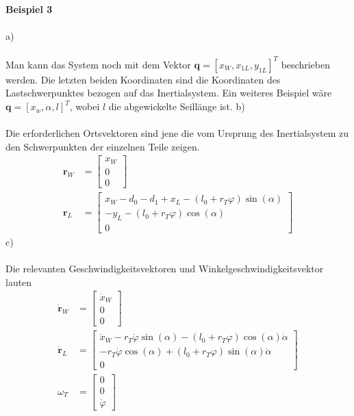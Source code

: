 \newpage
\noindent
\textbf{Beispiel 3}\\ \\
a)\\ \\
Man kann das System noch mit dem Vektor $\textbf{q} = [x_W , x_{1L} , y_{1L}]^T$ beschrieben werden. Die letzten beiden Koordinaten sind die Koordinaten des Lastschwerpunktes bezogen auf das Inertialsystem. Ein weiteres Beispiel wäre $\textbf{q} =[x_w , \alpha , l]^T$, wobei $l$ die abgewickelte Seillänge ist.
b)\\ \\
Die erforderlichen Ortsvektoren sind jene die vom Ursprung des Inertialsystem zu den Schwerpunkten der einzelnen Teile zeigen.
\begin{align*}
	\textbf{r}_W &= \begin{bmatrix}
		x_W \\
		0 \\
		0
	\end{bmatrix}
	\\
	\textbf{r}_L &= \begin{bmatrix}
		x_W - d_0 - d_1 + x_L - (l_0 + r_T\varphi)\sin(\alpha) \\
		-y_L - (l_0 + r_T\varphi)\cos(\alpha) \\
		0
	\end{bmatrix}
\end{align*}
c)\\ \\
Die relevanten Geschwindigkeitsvektoren und Winkelgeschwindigkeitsvektor lauten
\begin{align*}
	\dot{\textbf{r}}_W &= \begin{bmatrix}
		\dot{x}_W \\
		0 \\
		0
	\end{bmatrix}
	\\
	\dot{\textbf{r}}_L &= \begin{bmatrix}
		\dot{x}_W - r_T\dot{\varphi}\sin(\alpha) - (l_0 + r_T\varphi)\cos(\alpha)\dot{\alpha} \\
		-r_T\dot{\varphi}\cos(\alpha) + (l_0 + r_T\varphi)\sin(\alpha)\dot{\alpha} \\
		0
	\end{bmatrix}
	\\
	\omega_T &= \begin{bmatrix}
	 	0 \\
	 	0 \\
	 	\dot{\varphi}
	\end{bmatrix}
\end{align*}

